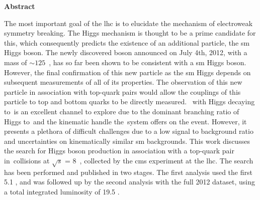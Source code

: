\begin{center}

\textbf{\Large Abstract}\\[0.25in]

\end{center}

\par The most important goal of the \acrfull{lhc} is to elucidate the mechanism of electroweak symmetry breaking.  The Higgs mechanism is thought to be a prime candidate for this, which consequently predicts the existence of an additional particle, the \acrfull{sm} Higgs boson.  The newly discovered boson announced on July 4th, 2012, with a mass of ${\sim}125$~\GeVcc, has so far been shown to be consistent with a \acrshort{sm} Higgs boson.  However, the final confirmation of this new particle as the \acrshort{sm} Higgs depends on subsequent measurements of all of its properties.  The observation of this new particle in association with top-quark pairs would allow the couplings of this particle to top and bottom quarks to be directly measured. ~\ttH with Higgs decaying to~\bbbar is an excellent channel to explore due to the dominant branching ratio of Higgs to~\bbbar and  the kinematic handle the~\ttbar system offers on the event.  However, it presents a plethora of difficult challenges due to a low signal to background ratio and uncertainties on kinematically similar \acrshort{sm} backgrounds.  This work discusses the search for Higgs boson production in association with a top-quark pair in~\pp collisions at $\sqrt{s}$ = 8~\TeV, collected by the \acrfull{cms} experiment at the \acrshort{lhc}.  The search has been performed and published in two stages.  The first analysis used the first 5.1 \fbinv, and was followed up by the second analysis with the full 2012 dataset, using a total integrated luminosity of 19.5 \fbinv.      

